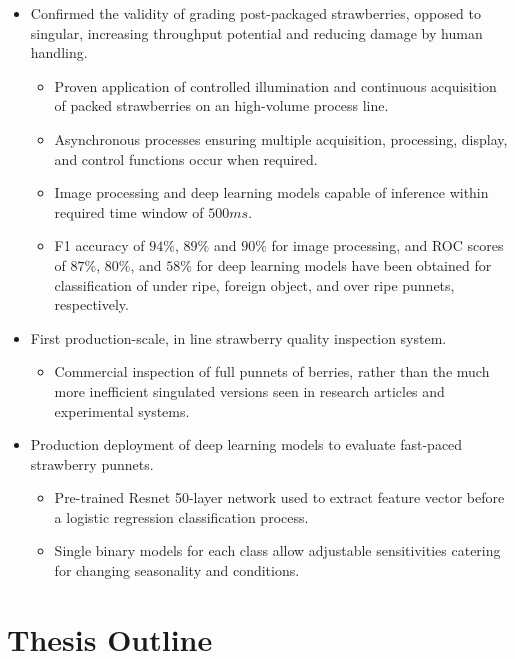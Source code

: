 \documentclass[fleqn,twoside,12pt]{report}
\begin{document}
\begin{itemize}
\begin{itemize}
	\end{itemize} 
	\item Confirmed the validity of grading post-packaged strawberries, opposed to singular, increasing throughput potential and reducing damage by human handling.
	\begin{itemize}
		\item Proven application of controlled illumination and continuous acquisition of packed strawberries on an high-volume process line. 
		\item Asynchronous processes ensuring multiple acquisition, processing, display, and control functions occur when required.
		\item Image processing and deep learning models capable of inference within required time window of $500ms$.
		\item F1 accuracy of $94\%$, $89\%$ and $90\%$ for image processing, and ROC scores of $87\%$, $80\%$, and $58\%$ for deep learning models have been obtained for classification of under ripe, foreign object, and over ripe punnets, respectively.
	\end{itemize}
	\item First production-scale, in line strawberry quality inspection system.
	\begin{itemize}
		\item Commercial inspection of full punnets of berries, rather than the much more inefficient singulated versions seen in research articles and experimental systems. 
	\end{itemize} 
	\item Production deployment of deep learning models to evaluate fast-paced strawberry punnets.
	\begin{itemize}
		\item Pre-trained Resnet 50-layer network used to extract feature vector before a logistic regression classification process. 
		\item Single binary models for each class allow adjustable sensitivities catering for changing seasonality and conditions.
	\end{itemize} 
\end{itemize}






\section{Thesis Outline}
\end{document}
